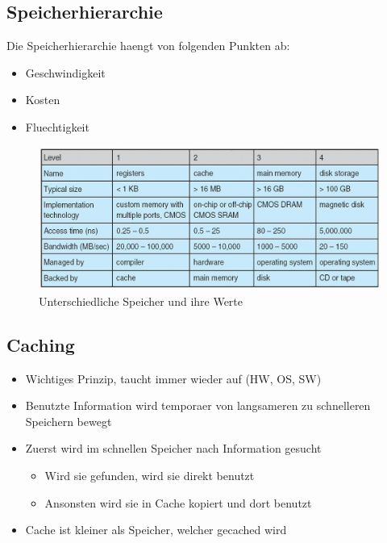 \documentclass[a4paper]{scrreprt}
\begin{document}
\subsection{Speicherhierarchie}
Die Speicherhierarchie haengt von folgenden Punkten ab:
\begin{itemize}
	\item Geschwindigkeit
	\item Kosten
	\item Fluechtigkeit
\end{itemize}

\begin{figure}[ht]
\centering
\includegraphics[scale=0.4]{graphics/storage.png}
\caption{Unterschiedliche Speicher und ihre Werte}
\end{figure}

\subsection{Caching}
\begin{itemize}
	\item Wichtiges Prinzip, taucht immer wieder auf (HW, OS, SW)
	\item Benutzte Information wird temporaer von langsameren zu schnelleren Speichern bewegt
	\item Zuerst wird im schnellen Speicher nach Information gesucht
		\begin{itemize}
			\item Wird sie gefunden, wird sie direkt benutzt
			\item Ansonsten wird sie in Cache kopiert und dort benutzt
		\end{itemize}
	\item Cache ist kleiner als Speicher, welcher gecached wird
\end{itemize}
\end{document}

